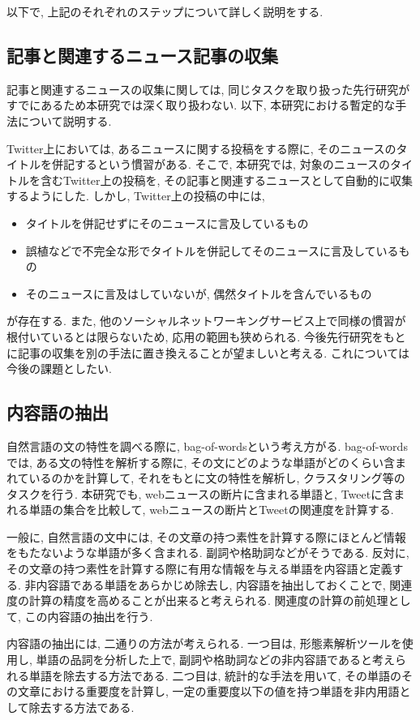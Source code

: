 \documentclass[12pt]{jarticle}
\begin{document}
以下で, 上記のそれぞれのステップについて詳しく説明をする. 

\subsection{記事と関連するニュース記事の収集}
記事と関連するニュースの収集に関しては, 同じタスクを取り扱った先行研究がすでにあるため本研究では深く取り扱わない. 以下, 本研究における暫定的な手法について説明する. 

Twitter上においては, あるニュースに関する投稿をする際に, そのニュースのタイトルを併記するという慣習がある. そこで, 本研究では, 対象のニュースのタイトルを含むTwitter上の投稿を, その記事と関連するニュースとして自動的に収集するようにした. しかし, Twitter上の投稿の中には, 

\begin{itemize}
  \item タイトルを併記せずにそのニュースに言及しているもの
  \item 誤植などで不完全な形でタイトルを併記してそのニュースに言及しているもの
  \item そのニュースに言及はしていないが, 偶然タイトルを含んでいるもの
\end{itemize}
が存在する. また, 他のソーシャルネットワーキングサービス上で同様の慣習が根付いているとは限らないため, 応用の範囲も狭められる. 今後先行研究をもとに記事の収集を別の手法に置き換えることが望ましいと考える. これについては今後の課題としたい. 

\subsection{内容語の抽出}
自然言語の文の特性を調べる際に, bag-of-words\cite{nlpml}という考え方がる. bag-of-wordsでは, ある文の特性を解析する際に, その文にどのような単語がどのくらい含まれているのかを計算して, それをもとに文の特性を解析し, クラスタリング等のタスクを行う. 本研究でも, webニュースの断片に含まれる単語と, Tweetに含まれる単語の集合を比較して, webニュースの断片とTweetの関連度を計算する. 

一般に, 自然言語の文中には, その文章の持つ素性を計算する際にほとんど情報をもたないような単語が多く含まれる. 副詞や格助詞などがそうである. 反対に, その文章の持つ素性を計算する際に有用な情報を与える単語を内容語と定義する. 非内容語である単語をあらかじめ除去し, 内容語を抽出しておくことで, 関連度の計算の精度を高めることが出来ると考えられる. 関連度の計算の前処理として, この内容語の抽出を行う. 

内容語の抽出には, 二通りの方法が考えられる. 一つ目は, 形態素解析ツールを使用し, 単語の品詞を分析した上で, 副詞や格助詞などの非内容語であると考えられる単語を除去する方法である. 二つ目は, 統計的な手法を用いて, その単語のその文章における重要度を計算し, 一定の重要度以下の値を持つ単語を非内用語として除去する方法である. 
\end{document}
